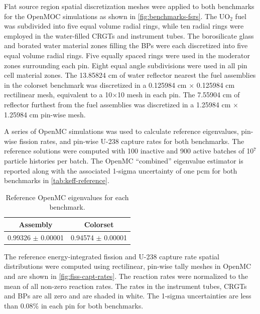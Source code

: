 Flat source region spatial discretization meshes were applied to both benchmarks for the OpenMOC simulations as shown in \autoref{fig:benchmarks-fsrs}. The UO$_2$ fuel was subdivided into five equal volume radial rings, while ten radial rings were employed in the water-filled CRGTs and instrument tubes. The borosilicate glass and borated water material zones filling the BPs were each discretized into five equal volume radial rings. Five equally spaced rings were used in the moderator zones surrounding each pin. Eight equal angle subdivisions were used in all pin cell material zones. The 13.85824 cm of water reflector nearest the fuel assemblies in the colorset benchmark was discretized in a 0.125984 cm $\times$ 0.125984 cm rectilinear mesh, equivalent to a 10$\times$10 mesh in each pin. The 7.55904 cm of reflector furthest from the fuel assemblies was discretized in a 1.25984 cm $\times$ 1.25984 cm pin-wise mesh.

A series of OpenMC simulations was used to calculate reference eigenvalues, pin-wise fission rates, and pin-wise U-238 capture rates for both benchmarks. The reference solutions were computed with 100 inactive and 900 active batches of 10$^7$ particle histories per batch. The OpenMC ``combined'' eigenvalue estimator is reported along with the associated 1-sigma uncertainty of one pcm for both benchmarks in \autoref{tab:keff-reference}.

\begin{table}[h!]
  \centering
  \caption{Reference OpenMC eigenvalues for each benchmark.}
  \label{tab:keff-reference} 
  \begin{tabular}{c c}
  \toprule
  {\bf Assembly} &
  {\bf Colorset} \\
  \midrule
  0.99326 $\pm$ 0.00001 & 0.94574 $\pm$ 0.00001 \\
  \bottomrule
\end{tabular}
\end{table}

The reference energy-integrated fission and U-238 capture rate spatial distributions were computed using rectilinear, pin-wise tally meshes in OpenMC and are shown in \autoref{fig:fiss-capt-rates}. The reaction rates were normalized to the mean of all non-zero reaction rates. The rates in the instrument tubes, CRGTs and BPs are all zero and are shaded in white. The 1-sigma uncertainties are less than 0.08\% in each pin for both benchmarks.

